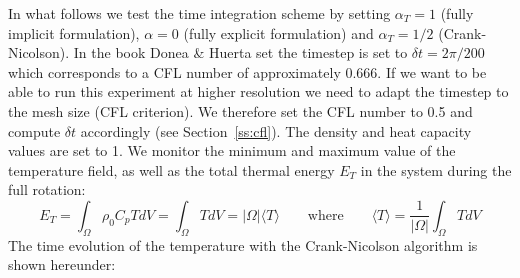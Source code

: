 In what follows we test the time integration scheme by setting $\alpha_T=1$ (fully implicit formulation), $\alpha=0$ (fully explicit formulation) and $\alpha_T=1/2$ (Crank-Nicolson).  
In the book Donea \& Huerta set the timestep is set to $\delta t=2\pi/200$ which corresponds to a CFL number of approximately 0.666. If we want to be able to run this experiment at higher 
resolution we need to adapt the timestep to the mesh size (CFL criterion). We therefore set the CFL number to 0.5 and compute $\delta t$ accordingly (see Section~\ref{ss:cfl}).  
The density and heat capacity values are set to 1. We monitor the minimum and maximum value of the temperature field, as well as the total thermal energy $E_T$ in the 
system during the full rotation:
\[
E_T=\int_\Omega \rho_0 C_p T dV = \int_\Omega T dV = |\Omega| \langle T \rangle 
\qquad
\text{where}
\qquad
\langle T \rangle = \frac{1}{|\Omega|} \int_\Omega T dV
\]
The time evolution of the temperature with the Crank-Nicolson algorithm is shown hereunder:
